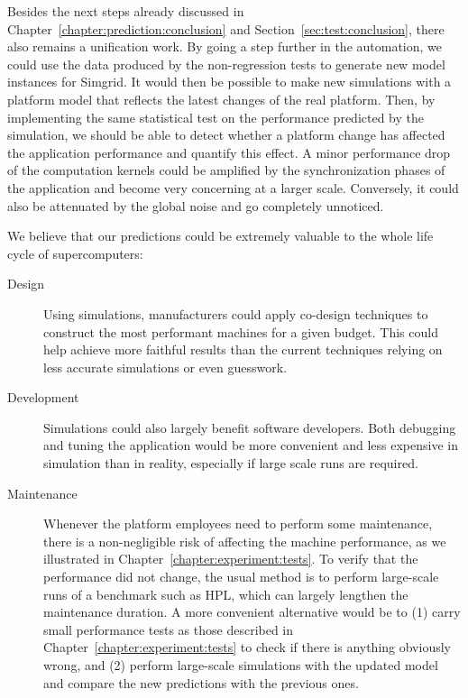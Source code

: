         Besides the next steps already discussed in Chapter~\ref{chapter:prediction:conclusion} and
        Section~\ref{sec:test:conclusion}, there also remains a unification work. By going a step further in the
        automation, we could use the data produced by the non-regression tests to generate new model instances for
        Simgrid. It would then be possible to make new simulations with a platform model that reflects the latest
        changes of the real platform. Then, by implementing the same statistical test on the performance predicted by
        the simulation, we should be able to detect whether a platform change has affected the application
        performance and quantify this effect. A minor performance drop of the computation kernels could be amplified by
        the synchronization phases of the application and become very concerning at a larger scale. Conversely, it could
        also be attenuated by the global noise and go completely unnoticed.

        We believe that our predictions could be extremely valuable to the whole life cycle of supercomputers:
        \begin{description}
            \item[Design] Using simulations, manufacturers could apply co-design techniques to construct the most
                performant machines for a given budget. This could help achieve more faithful results than the current
                techniques relying on less accurate simulations or even guesswork.
            \item[Development] Simulations could also largely benefit software developers. Both debugging and tuning the
                application would be more convenient and less expensive in simulation than in reality, especially if
                large scale runs are required.
            \item[Maintenance] Whenever the platform employees need to perform some maintenance, there is a
                non-negligible risk of affecting the machine performance, as we illustrated in
                Chapter~\ref{chapter:experiment:tests}. To verify that the performance did not change, the usual method is to
                perform large-scale runs of a benchmark such as HPL, which can largely lengthen the maintenance
                duration. A more convenient alternative would be to (1) carry small performance tests as those
                described in Chapter~\ref{chapter:experiment:tests} to check if there is anything obviously wrong, and
                (2) perform large-scale simulations with the updated model and compare the new predictions with the
                previous ones.
        \end{description}
